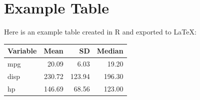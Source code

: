 \documentclass{article}
\begin{document}
\section*{Example Table}
Here is an example table created in R and exported to LaTeX:

\begin{longtable}{lrrr}
\toprule
Variable & Mean & SD & Median \\
\midrule
mpg       & 20.09 & 6.03 & 19.20 \\
disp      & 230.72 & 123.94 & 196.30 \\
hp        & 146.69 & 68.56 & 123.00 \\
\bottomrule
\end{longtable}
\end{document}
